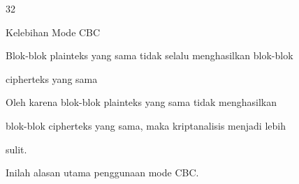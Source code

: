 \documentclass{article}
\begin{document}

32

Kelebihan Mode CBC


 Blok-blok plainteks yang sama tidak selalu menghasilkan blok-blok 

cipherteks yang sama

 Oleh karena blok-blok plainteks yang sama tidak menghasilkan 

blok-blok cipherteks yang sama, maka kriptanalisis menjadi lebih 

sulit. 

 Inilah alasan utama penggunaan mode CBC.
\end{document}
